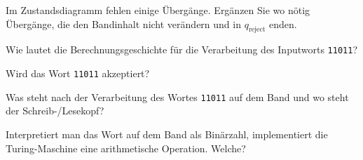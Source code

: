 \begin{teilaufgaben}
\item
Im Zustandsdiagramm fehlen einige Übergänge.
Ergänzen Sie wo nötig Übergänge, die den Bandinhalt nicht verändern und
in $q_{\text{reject}}$ enden.
\item
Wie lautet die Berechnungsgeschichte für die Verarbeitung des Inputworts
\texttt{11011}?
\item
Wird das Wort \texttt{11011} akzeptiert?
\item
Was steht nach der Verarbeitung des Wortes \texttt{11011} auf dem Band
und wo steht der Schreib-/Lesekopf?
\item
Interpretiert man das Wort auf dem Band als Binärzahl, implementiert
die Turing-Maschine eine arithmetische Operation.
Welche?
\end{teilaufgaben}


